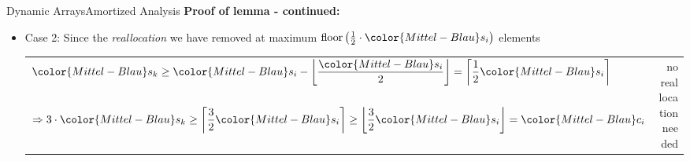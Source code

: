 \begin{frame}{Dynamic Arrays}{Amortized Analysis}
  \textbf{Proof of lemma - continued:}
      \begin{itemize}
        \item
          Case 2: Since the \textit{reallocation} we have removed at
          maximum $\mathrm{floor}\left(
            \frac{1}{2} \cdot {\color{Mittel-Blau}s_i}
          \right)$ elements
          \vspace{0.5em}\\
          \begin{tabularx}{\linewidth}{Xr}
           ${\color{Mittel-Blau}s_k}
             \geq {\color{Mittel-Blau}s_i} -
               \left\lfloor
                 \dfrac{\color{Mittel-Blau}s_i}{2}
                 \vphantom{\dfrac{1}{2}}
               \right\rfloor
             = \left\lceil\dfrac{1}{2} {\color{Mittel-Blau}s_i}\right\rceil$ &
           \multirow{2}{*}{\color{Mittel-Blau}no reallocation needed}\\[1.0em]
           $\Rightarrow 3 \cdot {\color{Mittel-Blau}s_k}
             \geq \left\lceil\dfrac{3}{2} {\color{Mittel-Blau}s_i}\right\rceil
             \geq \left\lfloor\dfrac{3}{2} {\color{Mittel-Blau}s_i}\right\rfloor
             = {\color{Mittel-Blau}c_i}$
          \end{tabularx}
      \end{itemize}
\end{frame}


